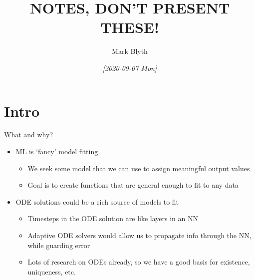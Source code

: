 \documentclass[presentation]{beamer}
\author{Mark Blyth}
\date{\textit{[2020-09-07 Mon]}}
\title{NOTES, DON'T PRESENT THESE!}
\begin{document}
\maketitle

\section{Intro}
\label{sec:org9b8dde5}
\begin{frame}[label={sec:org03b74d9},plain]{What and why?}
\begin{itemize}
\item ML is `fancy' model fitting
\begin{itemize}
\item We seek some model that we can use to assign meaningful output values
\item Goal is to create functions that are general enough to fit to any data
\end{itemize}

\item ODE solutions could be a rich source of models to fit
\begin{itemize}
\item Timesteps in the ODE solution are like layers in an NN
\item Adaptive ODE solvers would allow us to propagate info through the NN, while guarding error
\item Lots of research on ODEs already, so we have a good basis for existence, uniqueness, etc.
\end{itemize}
\end{itemize}
\end{frame}
\end{document}
